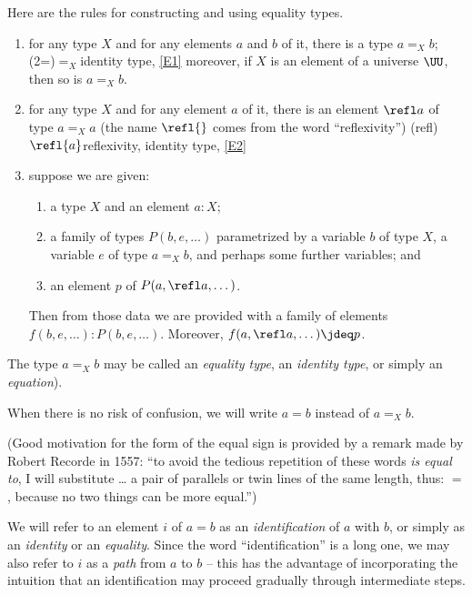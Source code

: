 Here are the rules for constructing and using equality types.
\begin{enumerate}[label=(E\arabic*),ref=(E\arabic*)]\label{rules-for-equality}
  \item\label{E1}
    for any type $X$ and for any elements $a$ and $b$ of it, there is a type $a =_X b$;%
    \glossary(2=){${=_X}$}{identity type, \cref{E1}}%
    moreover, if $X$ is an element of a universe $\UU$, then so is $a =_X b$.
  \item\label{E2} for any type $X$ and for any element $a$ of it, there is an element $\refl a$ of type $a =_X a$
    (the name $\refl{}$ comes from the word ``reflexivity'')%
    \glossary(refl){$\protect\refl{a}$}{reflexivity, identity type, \cref{E2}}
  \item\label{E3} suppose we are given:
    \begin{enumerate}
    \item a type $X$ and an element $a:X$;
    \item a family of types $P(b,e,\dots)$ parametrized by a variable $b$ of type $X$, a variable $e$ of type $a =_X b$, and perhaps some
      further variables; and
    \item an element $p$ of $P(a,\refl a,\dots)$.
    \end{enumerate}
    Then from those data we are provided with a family of elements $f(b,e,\dots) : P(b,e,\dots)$.
    Moreover, $f(a,\refl a,\dots) \jdeq p$.
\end{enumerate}

The type $a =_X b$ may be called an \emph{equality type}, an \emph{identity type}, or simply an \emph{equation}).

When there is no risk of confusion, we will write $a=b$ instead of $a =_X b$.

(Good motivation for the form of the equal sign is provided by a remark made by Robert Recorde in 1557:
``to avoid the tedious repetition of these words \emph{is equal to}, I will substitute \dots
a pair of parallels or twin lines of the same length, thus: $=$, because no two things can be more equal.'')

We will refer to an element $i$ of $a=b$ as an \emph{identification} of $a$ with $b$, or simply as an
\emph{identity} or an \emph{equality}.  Since the word ``identification'' is a long one, we may also refer to $i$ as a \emph{path} from $a$ to
$b$ -- this has the advantage of incorporating the intuition that an identification may proceed gradually through intermediate steps.%
%

